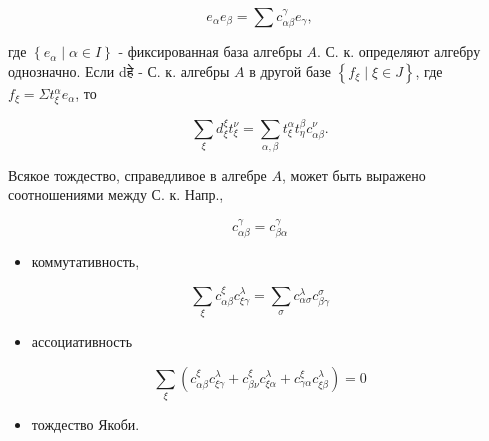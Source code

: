 \documentclass[10pt]{article}
\begin{document}
\[

e_{\alpha} e_{\beta}=\sum c_{\alpha \beta}^{\gamma} e_{\gamma},

\]



где $\left\{e_{\alpha} \mid \alpha \in I\right\}$ - фиксированная база алгебры $A$. С. к. определяют алгебру однозначно. Если dहे - С. к. алгебры $A$ в другой базе $\left\{f_{\xi} \mid \xi \in J\right\}$, где $f_{\xi}=\Sigma t_{\xi}^{\alpha} e_{\alpha}$, то



\[

\sum_{\xi} d_{\xi}^{\xi} t_{\xi}^{\nu}=\sum_{\alpha, \beta} t_{\xi}^{\alpha} t_{\eta}^{\beta} c_{\alpha \beta}^{\nu} .

\]



Всякое тождество, справедливое в алгебре $A$, может быть выражено соотношениями между С. к. Напр.,



\[

c_{\alpha \beta}^{\gamma}=c_{\beta \alpha}^{\gamma}

\]



\begin{itemize}

  \item коммутативность,

\end{itemize}



\[

\sum_{\xi} c_{\alpha \beta}^{\xi} c_{\xi \gamma}^{\lambda}=\sum_{\sigma} c_{\alpha \sigma}^{\lambda} c_{\beta \gamma}^{\sigma}

\]



\begin{itemize}

  \item ассоциативность

\end{itemize}



\[

\sum_{\xi}\left(c_{\alpha \beta}^{\xi} c_{\xi \gamma}^{\lambda}+c_{\beta \nu}^{\xi} c_{\xi \alpha}^{\lambda}+c_{\gamma \alpha}^{\xi} c_{\xi \beta}^{\lambda}\right)=0

\]



\begin{itemize}

  \item тождество Якоби.

\end{itemize}
\end{document}
